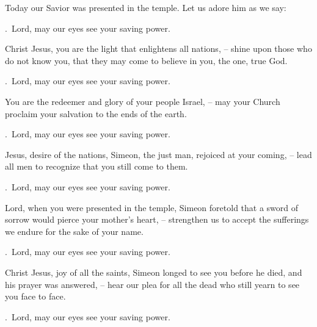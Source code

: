 \lettrine[loversize=0.15,lines=2]{T}{}oday our Savior was presented in the temple. Let us adore him as we say:
\par \Rbar.~Lord, may our eyes see your saving power.

Christ Jesus, you are the light that enlightens all nations,
– shine upon those who do not know you, that they may come to believe in you, the one, true God.
\par \Rbar.~Lord, may our eyes see your saving power.

You are the redeemer and glory of your people Israel,
– may your Church proclaim your salvation to the ends of the earth.
\par \Rbar.~Lord, may our eyes see your saving power.

Jesus, desire of the nations, Simeon, the just man, rejoiced at your coming,
– lead all men to recognize that you still come to them.
\par \Rbar.~Lord, may our eyes see your saving power.

Lord, when you were presented in the temple, Simeon foretold that a sword of sorrow would pierce your mother’s heart,
– strengthen us to accept the sufferings we endure for the sake of your name.
\par \Rbar.~Lord, may our eyes see your saving power.

Christ Jesus, joy of all the saints, Simeon longed to see you before he died, and his prayer was answered,
– hear our plea for all the dead who still yearn to see you face to face.
\par \Rbar.~Lord, may our eyes see your saving power.
